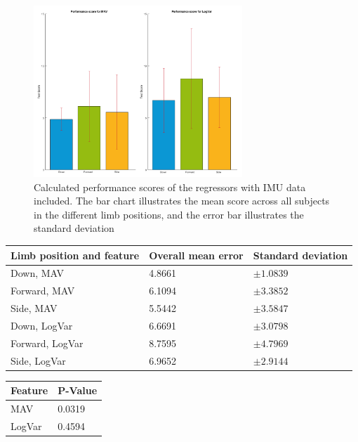 \begin{figure}[H]
	\includegraphics[width=0.7\textwidth]{figures/results/GotItTimeIMU}  %
	\caption{Calculated performance scores of the regressors with IMU data included. The bar chart illustrates the mean score across all subjects in the different limb positions, and the error bar illustrates the standard deviation}
	\label{fig:gotItTimeIMU}  %
\end{figure}

	\begin{center}
		\begin{tabular}{l l l}
			\toprule
			\textbf{Limb position and feature} & \textbf{Overall mean error} & \textbf{Standard deviation}\\
			\midrule
			Down, MAV & 4.8661 & $\pm 1.0839$ \\
			Forward, MAV & 6.1094 & $\pm 3.3852$ \\
			Side, MAV & 5.5442 & $\pm 3.5847$ \\
			Down, LogVar & 6.6691 & $\pm 3.0798$ \\
			Forward, LogVar & 8.7595 & $\pm 4.7969$ \\
			Side, LogVar & 6.9652 & $\pm 2.9144$ \\
			\bottomrule
		\end{tabular}
	\end{center}
	
		\begin{center}
			\begin{tabular}{l l}
				\toprule
				\textbf{Feature} & \textbf{P-Value}\\
				\midrule
				MAV & 0.0319 \\
				LogVar & 0.4594 \\
				\bottomrule
			\end{tabular}
		\end{center}

